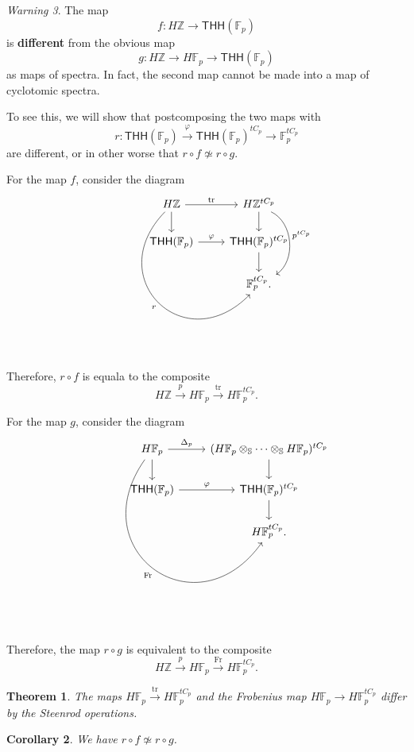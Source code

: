 \documentclass[10pt, oneside]{memoir}
\newtheorem{thm}{Theorem}[subsection]
\newtheorem{cor}[thm]{Corollary}
\theoremstyle{definition}
\theoremstyle{remark}
\newtheorem{warn}[thm]{Warning}
\theoremstyle{plain}
\theoremstyle{definition}
\theoremstyle{remark}
\newcommand{\Z}{\mathbb{Z}}
\newcommand{\F}{\mathbb{F}}
\newcommand{\bS}{\mathbb{S}}
\newcommand{\mr}[1]{\mathrm{#1}}
\newcommand{\on}[1]{\operatorname{#1}}
\newcommand{\ms}[1]{\mathsf{#1}}
\newcommand{\1}{\mathbf{1}}
\newcommand{\2}{\mathbf{2}}
\newcommand{\3}{\mathbf{3}}
\newcommand{\THH}{\ms{THH}}
\begin{document}
\begin{warn}
    The map
    \[ f \colon H\Z \to \THH(\F_p) \]
    is \textbf{different} from the obvious map
    \[ g \colon H\Z \to H\F_p \to \THH(\F_p) \]
    as maps of spectra. In fact, the second map cannot be made into a map of cyclotomic spectra.

    To see this, we will show that postcomposing the two maps with
    \[ r \colon \THH(\F_p) \xrightarrow{\varphi} \THH(\F_p)^{t C_p} \to \F_p^{t C_p} \]
    are different, or in other worse that \(r \circ f \not\simeq r \circ g \).

    For the map \(f \), consider the diagram
    \begin{equation*}
    \begin{tikzcd}
        H\Z \ar{r}{\on{tr}} \ar{d} \ar[bend right = 90, looseness=2]{ddr}[swap]{r} & H\Z^{t C_p} \ar{d} \ar[bend left=60]{dd}{p^{tC_p}} \\
        \THH(\F_p) \ar{r}{\varphi} & \THH(\F_p)^{tC_p} \ar{d} \\
        & \F_p^{t C_p}.
    \end{tikzcd}
    \end{equation*}
    Therefore, \(r \circ f \) is equala to the composite
    \[ H\Z \xrightarrow{p} H\F_p \xrightarrow{\mr{tr}} H\F_p^{t C_p}. \]

    For the map \(g \), consider the diagram
    \begin{equation*}
    \begin{tikzcd}
        H\F_p \ar{d} \ar{r}{\Delta_p} \ar[bend right=90,looseness=2]{ddr}[swap]{\mr{Fr}} & (H\F_p \otimes_{\bS} \cdots \otimes_{\bS} H\F_p)^{t C_p} \ar{d} \\
        \THH(\F_p) \ar{r}{\varphi} & \THH(\F_p)^{t C_p} \ar{d} \\
        & H \F_p^{t C_p}.
    \end{tikzcd}
    \end{equation*}
    Therefore, the map \(r \circ g \) is equivalent to the composite
    \[ H\Z \xrightarrow{p} H \F_p \xrightarrow{\mr{Fr}} H\F_p^{t C_p}. \]

    \begin{thm}
        The maps \(H \F_p \xrightarrow{\mr{tr}} H\F_p^{t C_p} \) and the Frobenius map \(H \F_p \to H\F_p^{t C_p} \) differ by the Steenrod operations.
    \end{thm}

    \begin{cor}
        We have \(r \circ f \not\simeq r \circ g \).
    \end{cor}
\end{warn}
\end{document}
